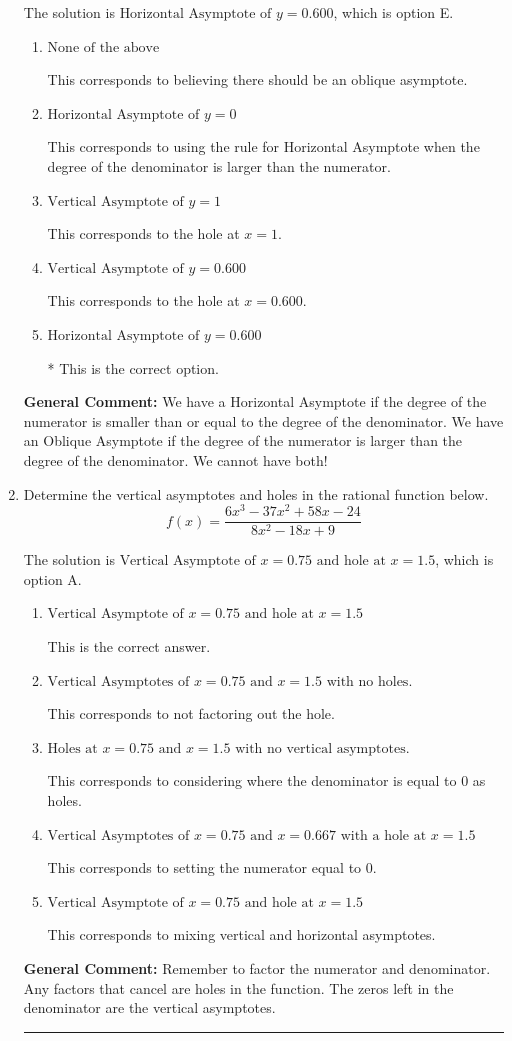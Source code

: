 \documentclass{extbook}[14pt]
\newcommand{\litem}[1]{\item #1

\rule{\textwidth}{0.4pt}}
\begin{document}
\begin{enumerate}
{The solution is \( \text{Horizontal Asymptote of } y = 0.600  \), which is option E.\begin{enumerate}[label=\Alph*.]
\item \( \text{None of the above} \)

This corresponds to believing there should be an oblique asymptote.
\item \( \text{Horizontal Asymptote of } y = 0  \)

This corresponds to using the rule for Horizontal Asymptote when the degree of the denominator is larger than the numerator.
\item \( \text{Vertical Asymptote of } y = 1  \)

This corresponds to the hole at $x = 1$.
\item \( \text{Vertical Asymptote of } y = 0.600  \)

This corresponds to the hole at $x = 0.600$.
\item \( \text{Horizontal Asymptote of } y = 0.600  \)

* This is the correct option.
\end{enumerate}

\textbf{General Comment:} We have a Horizontal Asymptote if the degree of the numerator is smaller than or equal to the degree of the denominator. We have an Oblique Asymptote if the degree of the numerator is larger than the degree of the denominator. We cannot have both!
}
\litem{
Determine the vertical asymptotes and holes in the rational function below.
\[ f(x) = \frac{6x^{3} -37 x^{2} +58 x -24}{8x^{2} -18 x + 9} \]

The solution is \( \text{Vertical Asymptote of } x = 0.75 \text{ and hole at } x = 1.5 \), which is option A.\begin{enumerate}[label=\Alph*.]
\item \( \text{Vertical Asymptote of } x = 0.75 \text{ and hole at } x = 1.5 \)

This is the correct answer.
\item \( \text{Vertical Asymptotes of } x = 0.75 \text{ and } x = 1.5 \text{ with no holes.} \)

This corresponds to not factoring out the hole.
\item \( \text{Holes at } x = 0.75 \text{ and } x = 1.5 \text{ with no vertical asymptotes.} \)

This corresponds to considering where the denominator is equal to 0 as holes.
\item \( \text{Vertical Asymptotes of } x = 0.75 \text{ and } x = 0.667 \text{ with a hole at } x = 1.5 \)

This corresponds to setting the numerator equal to 0.
\item \( \text{Vertical Asymptote of } x = 0.75 \text{ and hole at } x = 1.5 \)

This corresponds to mixing vertical and horizontal asymptotes.
\end{enumerate}

\textbf{General Comment:} Remember to factor the numerator and denominator. Any factors that cancel are holes in the function. The zeros left in the denominator are the vertical asymptotes.
}
\end{enumerate}
\end{document}
